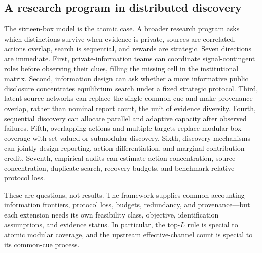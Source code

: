 \subsection*{A research program in distributed discovery}

The sixteen-box model is the atomic case. A broader research program asks which distinctions survive when evidence is private, sources are correlated, actions overlap, search is sequential, and rewards are strategic. Seven directions are immediate. First, private-information teams can coordinate signal-contingent roles before observing their clues, filling the missing cell in the institutional matrix. Second, information design can ask whether a more informative public disclosure concentrates equilibrium search under a fixed strategic protocol. Third, latent source networks can replace the single common cue and make provenance overlap, rather than nominal report count, the unit of evidence diversity. Fourth, sequential discovery can allocate parallel and adaptive capacity after observed failures. Fifth, overlapping actions and multiple targets replace modular box coverage with set-valued or submodular discovery. Sixth, discovery mechanisms can jointly design reporting, action differentiation, and marginal-contribution credit. Seventh, empirical audits can estimate action concentration, source concentration, duplicate search, recovery budgets, and benchmark-relative protocol loss.

These are questions, not results. The framework supplies common accounting---information frontiers, protocol loss, budgets, redundancy, and provenance---but each extension needs its own feasibility class, objective, identification assumptions, and evidence status. In particular, the top-$L$ rule is special to atomic modular coverage, and the upstream effective-channel count is special to its common-cue process.
